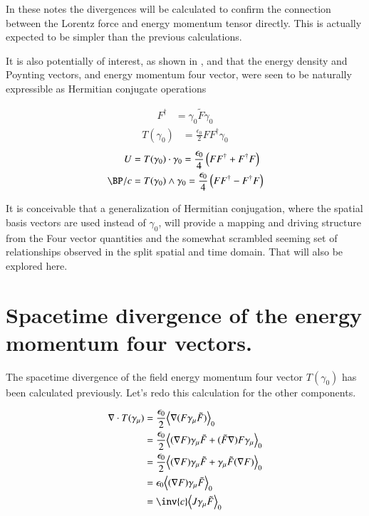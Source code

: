 In these notes the divergences will be calculated to confirm the
connection between the Lorentz force and energy momentum tensor directly.
This is actually expected to be simpler than the previous calculations.

It is also 
potentially of interest, as shown in , and
that the energy density and Poynting vectors, and energy momentum four vector,
were seen to be naturally expressible as Hermitian conjugate operations

\begin{align}
F^\dagger &= \gamma_0 \tilde{F} \gamma_0
\end{align}
\begin{align}
T(\gamma_0) &= \frac{\epsilon_0}{2} F F^\dagger \gamma_0
\end{align}
\begin{align}
U &= T(\gamma_0) \cdot \gamma_0 = \frac{\epsilon_0}{4} \left(F F^\dagger + F^\dagger F \right) \\
\BP/c &= T(\gamma_0) \wedge \gamma_0 = \frac{\epsilon_0}{4} \left(F F^\dagger - F^\dagger F \right)
\end{align}

It is conceivable that a generalization of Hermitian conjugation, where the spatial basis vectors are used instead of $\gamma_0$, will 
provide a mapping and driving structure from the Four vector quantities and the somewhat scrambled seeming set
of relationships observed in the split spatial and time domain.  That will also be explored here.

\section{Spacetime divergence of the energy momentum four vectors. }

The spacetime divergence of the field energy momentum four vector $T(\gamma_0)$ has been calculated previously.  Let's redo this 
calculation for the other components.

\begin{align*}
\grad \cdot T(\gamma_\mu) 
&= \frac{\epsilon_0}{2} \gpgradezero{ \grad (F \gamma_\mu \tilde{F}) } \\
&= \frac{\epsilon_0}{2} \gpgradezero{ (\grad F) \gamma_\mu \tilde{F} + (\tilde{F} \grad) F \gamma_\mu } \\
&= \frac{\epsilon_0}{2} \gpgradezero{ (\grad F) \gamma_\mu \tilde{F} + \gamma_\mu \tilde{F} (\grad F) } \\
&= {\epsilon_0} \gpgradezero{ (\grad F) \gamma_\mu \tilde{F} } \\
&= \inv{c} \gpgradezero{ J \gamma_\mu \tilde{F} } \\
\end{align*}

